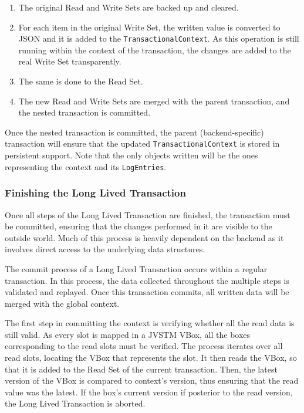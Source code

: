 \begin{enumerate}

\item The original Read and Write Sets are backed up and cleared.

\item For each item in the original Write Set, the written value is
  converted to JSON and it is added to the
  \texttt{TransactionalContext}. As this operation is still running
  within the context of the transaction, the changes are added to the
  real Write Set transparently.

\item The same is done to the Read Set.

\item The new Read and Write Sets are merged with the parent
  transaction, and the nested transaction is committed.

\end{enumerate}

Once the nested transaction is committed, the parent
(backend-specific) transaction will ensure that the updated
\texttt{TransactionalContext} is stored in persistent support. Note
that the only objects written will be the ones representing the
context and its \texttt{LogEntries}.

\subsubsection{Finishing the Long Lived Transaction}

Once all steps of the Long Lived Transaction are finished, the
transaction must be committed, ensuring that the changes performed in
it are visible to the outside world. Much of this process is heavily
dependent on the backend as it involves direct access to the
underlying data structures.

The commit process of a Long Lived Transaction occurs within a regular
transaction. In this process, the data collected throughout the
multiple steps is validated and replayed. Once this transaction
commits, all written data will be merged with the global context.

The first step in committing the context is verifying whether all the
read data is still valid. As every slot is mapped in a JVSTM VBox, all
the boxes corresponding to the read slots must be verified. The
process iterates over all read slots, locating the VBox that
represents the slot. It then reads the VBox, so that it is added to
the Read Set of the current transaction. Then, the latest version of
the VBox is compared to context's version, thus ensuring that the read
value was the latest. If the box's current version if posterior to the
read version, the Long Lived Transaction is aborted.

